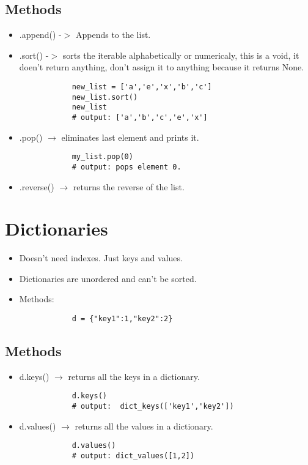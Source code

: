 \subsection{Methods}
\begin{itemize}
    \item .append() -$>$ Appends to the list. 
    \item .sort() -$>$ sorts the iterable alphabetically or numericaly, this is a void, it doen't return anything, don't assign it to anything because it returns None.
        \begin{verbatim}
            new_list = ['a','e','x','b','c']
            new_list.sort()
            new_list
            # output: ['a','b','c','e','x']
        \end{verbatim}
        
    \item .pop() $\rightarrow$  eliminates last element and prints it.
        \begin{verbatim}
            my_list.pop(0) 
            # output: pops element 0.
        \end{verbatim}
        
    \item .reverse() $\rightarrow$ returns the reverse of the list. 
\end{itemize}

\section{Dictionaries}
\begin{itemize}
    \item Doesn't need indexes. Just keys and values. 
    \item Dictionaries are unordered and can't be sorted.
    \item Methods:
        \begin{verbatim}
            d = {"key1":1,"key2":2}
        \end{verbatim}
\end{itemize}

\subsection{Methods}
\begin{itemize}
    \item d.keys() $\rightarrow$ returns all the keys in a dictionary.
        \begin{verbatim}
            d.keys() 
            # output:  dict_keys(['key1','key2'])
        \end{verbatim}

    \item d.values() $\rightarrow$ returns all the values in a dictionary.
        \begin{verbatim}
            d.values() 
            # output: dict_values([1,2])
        \end{verbatim}

\end{itemize}

